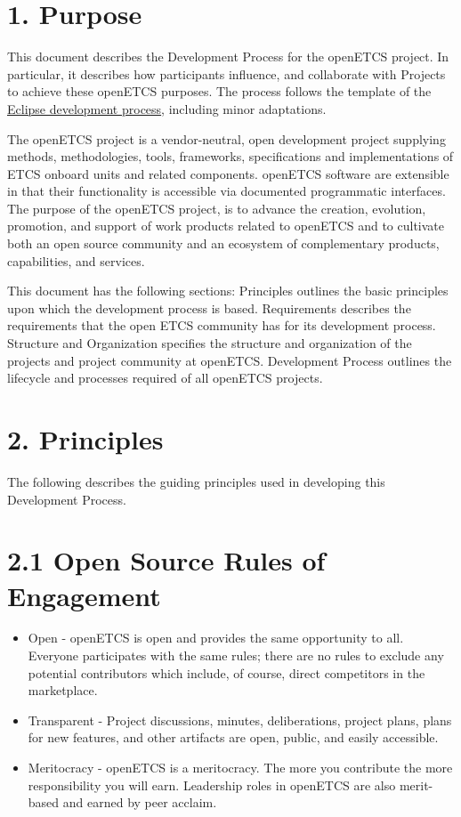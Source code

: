 \section{1. Purpose}\label{purpose}

This document describes the Development Process for the openETCS
project. In particular, it describes how participants influence, and
collaborate with Projects to achieve these openETCS purposes. The
process follows the template of the
\href{http://www.eclipse.org/projects/dev_process/development_process_2011.php}{Eclipse
development process}, including minor adaptations.

The openETCS project is a vendor-neutral, open development project
supplying methods, methodologies, tools, frameworks, specifications and
implementations of ETCS onboard units and related components. openETCS
software are extensible in that their functionality is accessible via
documented programmatic interfaces. The purpose of the openETCS project,
is to advance the creation, evolution, promotion, and support of work
products related to openETCS and to cultivate both an open source
community and an ecosystem of complementary products, capabilities, and
services.

This document has the following sections: Principles outlines the basic
principles upon which the development process is based. Requirements
describes the requirements that the open ETCS community has for its
development process. Structure and Organization specifies the structure
and organization of the projects and project community at openETCS.
Development Process outlines the lifecycle and processes required of all
openETCS projects. 

\section{2. Principles}\label{principles}

The following describes the guiding principles used in developing this
Development Process.

\section{2.1 Open Source Rules of Engagement}

\begin{itemize}

\item
  Open - openETCS is open and provides the same opportunity to all.
  Everyone participates with the same rules; there are no rules to
  exclude any potential contributors which include, of course, direct
  competitors in the marketplace.
\item
  Transparent - Project discussions, minutes, deliberations, project
  plans, plans for new features, and other artifacts are open, public,
  and easily accessible.
\item
  Meritocracy - openETCS is a meritocracy. The more you contribute the
  more responsibility you will earn. Leadership roles in openETCS are
  also merit-based and earned by peer acclaim.
\end{itemize}

